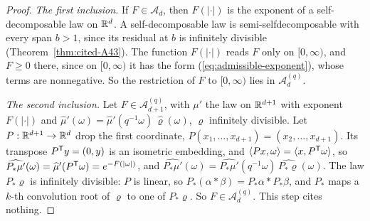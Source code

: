 \begin{proof}
\emph{The first inclusion.} If $F \in \mathcal{A}_d$, then $F(|\cdot|)$ is the exponent of a
self-decomposable law on $\mathbb{R}^d$. A self-decomposable law is semi-selfdecomposable with every span
$b > 1$, since its residual at $b$ is infinitely divisible (Theorem~\ref{thm:cited-A43}). The
function $F(|\cdot|)$ reads $F$ only on $[0,\infty)$, and $F \ge 0$ there, since on
$[0,\infty)$ it has the form (\ref{eq:admissible-exponent}), whose terms are nonnegative. So the
restriction of $F$ to $[0,\infty)$ lies in $\mathcal{A}^{(q)}_d$.

\emph{The second inclusion.} Let $F \in \mathcal{A}^{(q)}_{d+1}$, with $\mu'$ the law on $\mathbb{R}^{d+1}$
with exponent $F(|\cdot|)$ and $\widehat\mu'(\omega) = \widehat\mu'(q^{-1}\omega)\,\widehat\varrho(\omega)$,
$\varrho$ infinitely divisible. Let $P : \mathbb{R}^{d+1} \to \mathbb{R}^d$ drop the first coordinate,
$P(x_1, \dots, x_{d+1}) = (x_2, \dots, x_{d+1})$. Its transpose $P^{\mathsf{T}}y = (0, y)$ is an isometric
embedding, and $\langle Px, \omega\rangle = \langle x, P^{\mathsf{T}}\omega\rangle$, so
$\widehat{P_*\mu'}(\omega) = \widehat\mu'(P^{\mathsf{T}}\omega) = e^{-F(|\omega|)}$, and
$\widehat{P_*\mu'}(\omega) = \widehat{P_*\mu'}(q^{-1}\omega)\,\widehat{P_*\varrho}(\omega)$. The law
$P_*\varrho$ is infinitely divisible: $P$ is linear, so $P_*(\alpha * \beta) = P_*\alpha * P_*\beta$,
and $P_*$ maps a $k$-th convolution root of $\varrho$ to one of $P_*\varrho$. So
$F \in \mathcal{A}^{(q)}_d$. This step cites nothing.


\end{proof}
